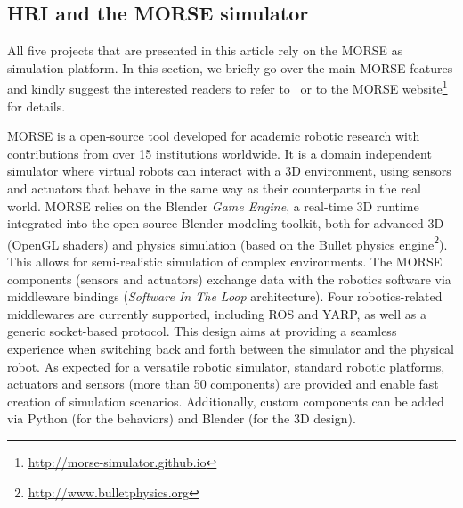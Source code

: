 \documentclass{llncs}
\begin{document}
\subsection*{HRI and the MORSE simulator}

All five projects that are presented in this article rely on the MORSE as
simulation platform. In this section, we briefly go over the main MORSE features
and kindly suggest the interested readers to refer to~\cite{morse_simpar_2012}
or to the MORSE website\footnote{\url{http://morse-simulator.github.io}} for
details.

MORSE is a open-source tool developed for academic robotic research with
contributions from over 15 institutions worldwide. It is a domain independent
simulator where virtual robots can interact with a 3D environment, using sensors
and actuators that behave in the same way as their counterparts in the real
world. MORSE relies on the Blender \emph{Game Engine}, a real-time 3D runtime
integrated into the open-source Blender modeling toolkit, both for advanced 3D
(OpenGL shaders) and physics simulation (based on the {\sc Bullet} physics
engine\footnote{\url{http://www.bulletphysics.org}}). This allows for semi-realistic simulation of complex environments.
The MORSE components (sensors and actuators) exchange data with the robotics
software via middleware bindings (\emph{Software In The Loop} architecture).
Four robotics-related middlewares are currently supported, including ROS and YARP, as
well as a generic socket-based protocol. This design aims at providing a
seamless experience when switching back and forth between the simulator and the
physical robot. As expected for a versatile robotic simulator, standard
robotic platforms, actuators and sensors (more than 50 components) are
provided and enable fast creation of simulation scenarios. Additionally, custom
components can be added via Python (for the behaviors) and Blender (for the 3D
design).

\end{document}
